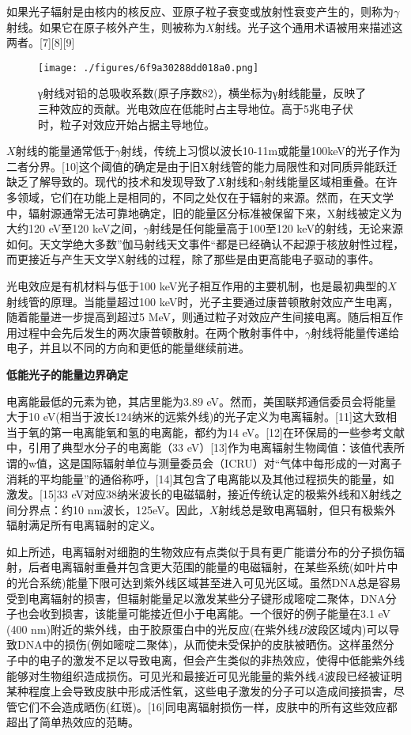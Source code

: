 如果光子辐射是由核内的核反应、亚原子粒子衰变或放射性衰变产生的，则称为$\gamma$射线。如果它在原子核外产生，则被称为$X$射线。光子这个通用术语被用来描述这两者。[7][8][9]
\begin{figure}[ht]
\centering
\texttt{[image: ./figures/6f9a30288dd018a0.png]}
\caption{γ射线对铅的总吸收系数(原子序数82)，横坐标为γ射线能量，反映了三种效应的贡献。光电效应在低能时占主导地位。高于5兆电子伏时，粒子对效应开始占据主导地位。} \label{fig_DLFS_4}
\end{figure}
$X$射线的能量通常低于$\gamma$射线，传统上习惯以波长10-11m或能量100keV的光子作为二者分界。[10]这个阈值的确定是由于旧X射线管的能力局限性和对同质异能跃迁缺乏了解导致的。现代的技术和发现导致了$X$射线和$\gamma$射线能量区域相重叠。在许多领域，它们在功能上是相同的，不同之处仅在于辐射的来源。然而，在天文学中，辐射源通常无法可靠地确定，旧的能量区分标准被保留下来，X射线被定义为大约120 eV至120 keV之间，$\gamma$射线是任何能量高于100至120 keV的射线，无论来源如何。天文学绝大多数”伽马射线天文事件“都是已经确认不起源于核放射性过程，而更接近与产生天文学X射线的过程，除了那些是由更高能电子驱动的事件。

光电效应是有机材料与低于100 keV光子相互作用的主要机制，也是最初典型的$X$射线管的原理。当能量超过100 keV时，光子主要通过康普顿散射效应产生电离，随着能量进一步提高到超过5 MeV，则通过粒子对效应产生间接电离。随后相互作用过程中会先后发生的两次康普顿散射。在两个散射事件中，$\gamma$射线将能量传递给电子，并且以不同的方向和更低的能量继续前进。

\textbf{低能光子的能量边界确定}

电离能最低的元素为铯，其店里能为3.89 eV。然而，美国联邦通信委员会将能量大于10 eV(相当于波长124纳米的远紫外线)的光子定义为电离辐射。[11]这大致相当于氧的第一电离能氧和氢的电离能，都约为14 eV。[12]在环保局的一些参考文献中，引用了典型水分子的电离能（33 eV）[13]作为电离辐射生物阈值：该值代表所谓的w值，这是国际辐射单位与测量委员会（ICRU）对“气体中每形成的一对离子消耗的平均能量”的通俗称呼，[14]其包含了电离能以及其他过程损失的能量，如激发。[15]33 eV对应38纳米波长的电磁辐射，接近传统认定的极紫外线和X射线之间分界点：约10 nm波长，125eV。因此，$X$射线总是致电离辐射，但只有极紫外辐射满足所有电离辐射的定义。

如上所述，电离辐射对细胞的生物效应有点类似于具有更广能谱分布的分子损伤辐射，后者电离辐射重叠并包含更大范围的能量的电磁辐射，在某些系统(如叶片中的光合系统)能量下限可达到紫外线区域甚至进入可见光区域。虽然DNA总是容易受到电离辐射的损害，但辐射能量足以激发某些分子键形成嘧啶二聚体，DNA分子也会收到损害，该能量可能接近但小于电离能。一个很好的例子能量在3.1 eV (400 nm)附近的紫外线，由于胶原蛋白中的光反应(在紫外线$B$波段区域内)可以导致DNA中的损伤(例如嘧啶二聚体)，从而使未受保护的皮肤被晒伤。这样虽然分子中的电子的激发不足以导致电离，但会产生类似的非热效应，使得中低能紫外线能够对生物组织造成损伤。可见光和最接近可见光能量的紫外线$A$波段已经被证明某种程度上会导致皮肤中形成活性氧，这些电子激发的分子可以造成间接损害，尽管它们不会造成晒伤(红斑)。[16]同电离辐射损伤一样，皮肤中的所有这些效应都超出了简单热效应的范畴。

